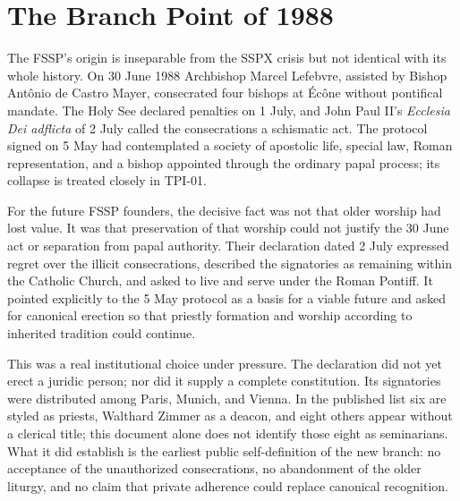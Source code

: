 \section{The Branch Point of 1988}

The FSSP's origin is inseparable from the SSPX crisis but not identical with its whole history. On 30 June 1988 Archbishop Marcel Lefebvre, assisted by Bishop Antônio de Castro Mayer, consecrated four bishops at Écône without pontifical mandate. The Holy See declared penalties on 1 July, and John Paul II's \emph{Ecclesia Dei adflicta} of 2 July called the consecrations a schismatic act. The protocol signed on 5 May had contemplated a society of apostolic life, special law, Roman representation, and a bishop appointed through the ordinary papal process; its collapse is treated closely in TPI-01.

For the future FSSP founders, the decisive fact was not that older worship had lost value. It was that preservation of that worship could not justify the 30 June act or separation from papal authority. Their declaration dated 2 July expressed regret over the illicit consecrations, described the signatories as remaining within the Catholic Church, and asked to live and serve under the Roman Pontiff. It pointed explicitly to the 5 May protocol as a basis for a viable future and asked for canonical erection so that priestly formation and worship according to inherited tradition could continue.

This was a real institutional choice under pressure. The declaration did not yet erect a juridic person; nor did it supply a complete constitution. Its signatories were distributed among Paris, Munich, and Vienna. In the published list six are styled as priests, Walthard Zimmer as a deacon, and eight others appear without a clerical title; this document alone does not identify those eight as seminarians. What it did establish is the earliest public self-definition of the new branch: no acceptance of the unauthorized consecrations, no abandonment of the older liturgy, and no claim that private adherence could replace canonical recognition.


